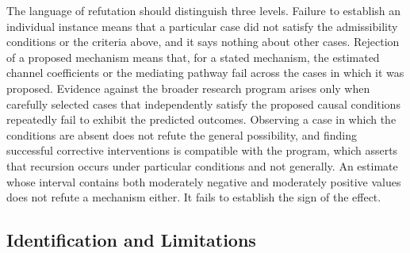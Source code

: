 \documentclass[12pt]{article}
\theoremstyle{remark}
\begin{document}
The language of refutation should distinguish three levels. Failure to establish an individual instance means that a particular case did not satisfy the admissibility conditions or the criteria above, and it says nothing about other cases. Rejection of a proposed mechanism means that, for a stated mechanism, the estimated channel coefficients or the mediating pathway fail across the cases in which it was proposed. Evidence against the broader research program arises only when carefully selected cases that independently satisfy the proposed causal conditions repeatedly fail to exhibit the predicted outcomes. Observing a case in which the conditions are absent does not refute the general possibility, and finding successful corrective interventions is compatible with the program, which asserts that recursion occurs under particular conditions and not generally. An estimate whose interval contains both moderately negative and moderately positive values does not refute a mechanism either. It fails to establish the sign of the effect.

\subsection{Identification and Limitations}
\end{document}
